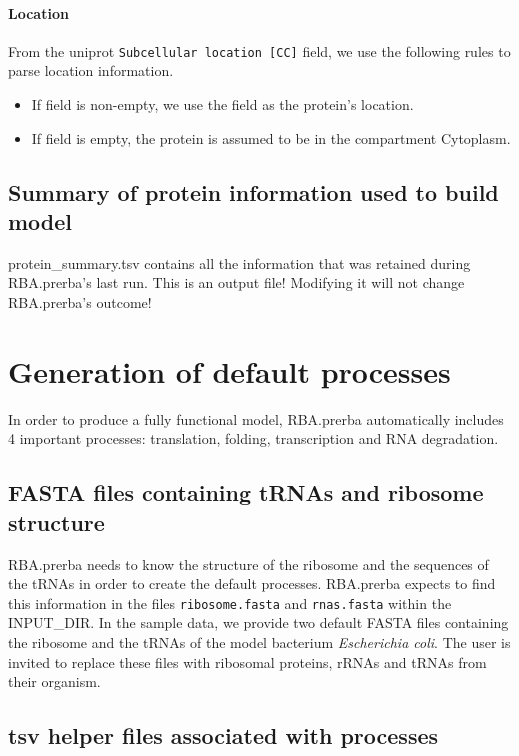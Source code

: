\paragraph{Location}
From the uniprot \texttt{Subcellular location [CC]} field,
we use the following rules to parse location information.
\begin{itemize}
\item If field is non-empty, we use the field as the protein's location.
\item If field is empty, the protein is assumed to be in the compartment Cytoplasm.
\end{itemize}

\subsection{Summary of protein information used to build model}

protein\_summary.tsv contains all the information that was retained during RBA.prerba's last run.
This is an output file! Modifying it will not change RBA.prerba's outcome!

\section{Generation of default processes}

In order to produce a fully functional model,
RBA.prerba automatically includes 4 important processes:
translation, folding, transcription and RNA degradation.

\subsection{FASTA files containing tRNAs and ribosome structure}
RBA.prerba needs to know the structure of the ribosome and the sequences of the
tRNAs in order to create the default processes.
RBA.prerba expects to find this information in the files
\texttt{ribosome.fasta} and \texttt{rnas.fasta} within the INPUT\_DIR.
In the sample data, we provide two default FASTA files containing the ribosome
and the tRNAs of the model bacterium \textit{Escherichia coli}.
The user is invited to replace these files with ribosomal proteins, rRNAs and tRNAs from
their organism.

\subsection{tsv helper files associated with processes}

